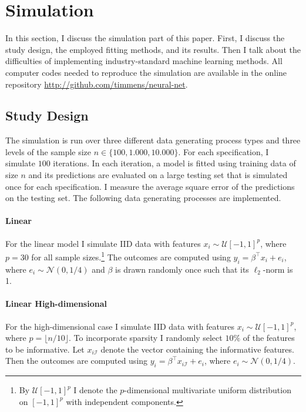 \section{Simulation}
\label{seq:simulation}

In this section, I discuss the simulation part of this paper. First, I discuss the study
design, the employed fitting methods, and its results. Then I talk about the
difficulties of implementing industry-standard machine learning methods. All computer
codes needed to reproduce the simulation are available in the online repository
\url{http://github.com/timmens/neural-net}.

\subsection{Study Design}

The simulation is run over three different data generating process types and three
levels of the sample size $n \in \{100, 1.000, 10.000\}$. For each specification, I
simulate $100$ iterations. In each iteration, a model is fitted using training data of
size $n$ and its predictions are evaluated on a large testing set that is simulated once
for each specification. I measure the average square error of the predictions on the
testing set. The following data generating processes are implemented.

\paragraph{Linear}

For the linear model I simulate IID data with features $x_i \sim \mathcal{U}[-1, 1]^p$,
where $p = 30$ for all sample sizes.\footnote{By $\mathcal{U}[-1, 1]^p$ I denote the
$p$-dimensional multivariate uniform distribution on $[-1, 1]^p$ with independent
components.} The outcomes are computed using $y_i = \beta^\top x_i + e_i$, where $e_i
\sim \mathcal{N}(0, 1/4)$ and $\beta$ is drawn randomly once such that its $\ell_2$-norm
is 1.

\paragraph{Linear High-dimensional}

For the high-dimensional case I simulate IID data with features $x_i \sim
\mathcal{U}[-1, 1]^p$, where $p = \lfloor n / 10 \rfloor$. To incorporate sparsity I
randomly select $10\%$ of the features to be informative. Let $x_{i\mathcal{I}}$ denote
the vector containing the informative features. Then the outcomes are computed using
$y_i = \beta^\top x_{i\mathcal{I}} + e_i$, where $e_i \sim \mathcal{N}(0, 1/4)$.

